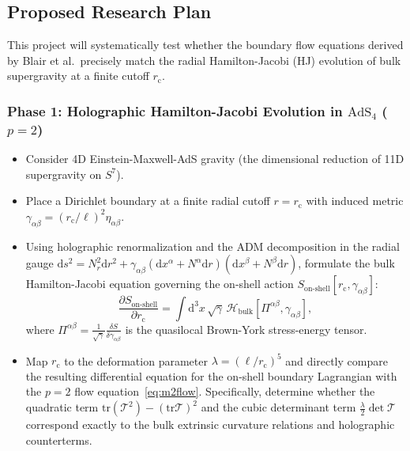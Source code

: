 \documentclass[11pt,a4paper]{article}
\newcommand{\dd}{\mathrm{d}}
\begin{document}
\subsection{Proposed Research Plan}
This project will systematically test whether the boundary flow equations derived by Blair et al.\ precisely match the radial Hamilton-Jacobi (HJ) evolution of bulk supergravity at a finite cutoff $r_{\text{c}}$.

\subsubsection*{Phase 1: Holographic Hamilton-Jacobi Evolution in $\text{AdS}_4$ ($p=2$)}
\begin{itemize}
    \item Consider 4D Einstein-Maxwell-AdS gravity (the dimensional reduction of 11D supergravity on $S^7$).
    \item Place a Dirichlet boundary at a finite radial cutoff $r = r_{\text{c}}$ with induced metric $\gamma_{\alpha\beta} = (r_{\text{c}}/\ell)^2 \eta_{\alpha\beta}$.
    \item Using holographic renormalization and the ADM decomposition in the radial gauge $\dd s^2 = N_r^2 \dd r^2 + \gamma_{\alpha\beta} (\dd x^\alpha + N^\alpha \dd r)(\dd x^\beta + N^\beta \dd r)$, formulate the bulk Hamilton-Jacobi equation governing the on-shell action $S_{\text{on-shell}}[r_{\text{c}}, \gamma_{\alpha\beta}]$:
    \begin{equation}
        \frac{\partial S_{\text{on-shell}}}{\partial r_{\text{c}}} = \int \dd^3 x \, \sqrt{\gamma} \, \mathcal{H}_{\text{bulk}}\left[ \Pi^{\alpha\beta}, \gamma_{\alpha\beta} \right],
    \end{equation}
    where $\Pi^{\alpha\beta} = \frac{1}{\sqrt{\gamma}}\frac{\delta S}{\delta \gamma_{\alpha\beta}}$ is the quasilocal Brown-York stress-energy tensor.
    \item Map $r_{\text{c}}$ to the deformation parameter $\lambda = (\ell/r_{\text{c}})^5$ and directly compare the resulting differential equation for the on-shell boundary Lagrangian with the $p=2$ flow equation~\eqref{eq:m2flow}. Specifically, determine whether the quadratic term $\mathrm{tr}(\mathcal{T}^2) - (\mathrm{tr}\mathcal{T})^2$ and the cubic determinant term $\frac{\lambda}{2}\det \mathcal{T}$ correspond exactly to the bulk extrinsic curvature relations and holographic counterterms.
\end{itemize}
\end{document}
